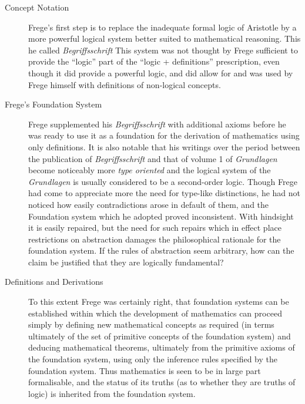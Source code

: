 \begin{description}
\item[Concept Notation]

Frege's first step is to replace the inadequate formal logic of Aristotle by a more powerful logical system better suited to mathematical reasoning.
This he called {\it Begriffsschrift} \cite{Frege1879}
This system was not thought by Frege sufficient to provide the ``logic'' part of the ``logic + definitions'' prescription, even though it did provide a powerful logic, and did allow for and was used by Frege himself with definitions of non-logical concepts.

\item[Frege's Foundation System]

Frege supplemented his {\it Begriffsschrift} with additional axioms before he was ready to use it as a foundation for the derivation of mathematics using only definitions.
It is also notable that his writings over the period between the publication of {\it Begriffsschrift} and that of volume 1 of {\it Grundlagen} become noticeably more {\it type oriented} and the logical system of the  {\it Grundlagen} is usually considered to be a second-order logic.
Though Frege had come to appreciate more the need for type-like distinctions, he had not noticed how easily contradictions arose in default of them, and the Foundation system which he adopted proved inconsistent.
With hindsight it is easily repaired, but the need for such repairs which in effect place restrictions on abstraction damages the philosophical rationale for the foundation system.
If the rules of abstraction seem arbitrary, how can the claim be justified that they are logically fundamental?

\item[Definitions and Derivations]

To this extent Frege was certainly right, that foundation systems can be established within which the development of mathematics can proceed simply by defining new mathematical concepts as required (in terms ultimately of the set of primitive concepts of the foundation system) and deducing mathematical theorems, ultimately from the primitive axioms of the foundation system, using only the inference rules specified by the foundation system.
Thus mathematics is seen to be in large part formalisable, and the status of its truths (as to whether they are truths of logic) is inherited from the foundation system.

\end{description}

